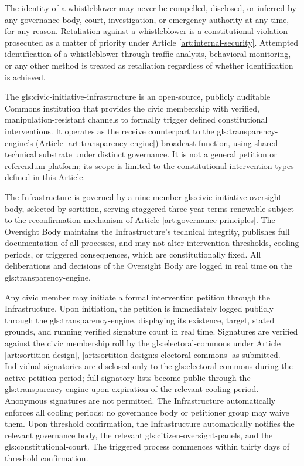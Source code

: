The identity of a whistleblower may never be compelled, disclosed, or inferred by any governance body, court, investigation, or emergency authority at any time, for any reason. Retaliation against a whistleblower is a constitutional violation prosecuted as a matter of priority under Article \ref{art:internal-security}. Attempted identification of a whistleblower through traffic analysis, behavioral monitoring, or any other method is treated as retaliation regardless of whether identification is achieved.


The \gls{gls:civic-initiative-infrastructure} is an open-source, publicly auditable Commons institution that provides the civic membership with verified, manipulation-resistant channels to formally trigger defined constitutional interventions. It operates as the receive counterpart to the \gls{gls:transparency-engine}'s (Article \ref{art:transparency-engine}) broadcast function, using shared technical substrate under distinct governance. It is not a general petition or referendum platform; its scope is limited to the constitutional intervention types defined in this Article.

The Infrastructure is governed by a nine-member \gls{gls:civic-initiative-oversight-body}, selected by sortition, serving staggered three-year terms renewable subject to the reconfirmation mechanism of Article \ref{art:governance-principles}. The Oversight Body maintains the Infrastructure's technical integrity, publishes full documentation of all processes, and may not alter intervention thresholds, cooling periods, or triggered consequences, which are constitutionally fixed. All deliberations and decisions of the Oversight Body are logged in real time on the \gls{gls:transparency-engine}.

Any civic member may initiate a formal intervention petition through the Infrastructure. Upon initiation, the petition is immediately logged publicly through the \gls{gls:transparency-engine}, displaying its existence, target, stated grounds, and running verified signature count in real time. Signatures are verified against the civic membership roll by the \gls{gls:electoral-commons} under Article \ref{art:sortition-design}, \ref{art:sortition-design:s-electoral-commons} as submitted. Individual signatories are disclosed only to the \gls{gls:electoral-commons} during the active petition period; full signatory lists become public through the \gls{gls:transparency-engine} upon expiration of the relevant cooling period. Anonymous signatures are not permitted. The Infrastructure automatically enforces all cooling periods; no governance body or petitioner group may waive them. Upon threshold confirmation, the Infrastructure automatically notifies the relevant governance body, the relevant \gls{gls:citizen-oversight-panels}, and the \gls{gls:constitutional-court}. The triggered process commences within thirty days of threshold confirmation.

